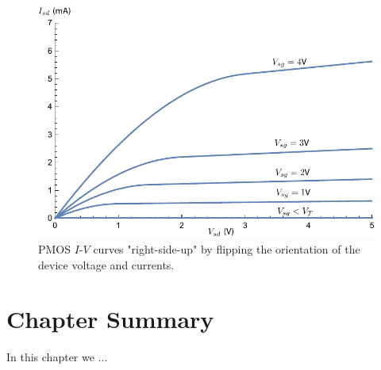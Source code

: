 \begin{figure}[H]
\centering
\includegraphics[width=\columnwidth]{ids_pmos_negative}
\caption{PMOS $I$-$V$ curves "right-side-up" by flipping the orientation of the device voltage and currents.}
\label{fig:ids_pmos_negative}
\end{figure}
\newpage
\section{Chapter Summary}
In this chapter we ...
